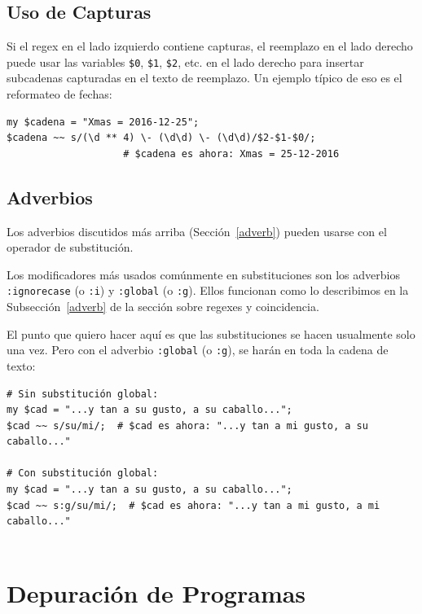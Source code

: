 \subsection{Uso de Capturas}

Si el regex en el lado izquierdo contiene capturas, el 
reemplazo en el lado derecho puede usar las variables
\verb|$0|, \verb|$1|, \verb|$2|, etc. en el lado derecho para 
insertar subcadenas capturadas en el texto de reemplazo. Un 
ejemplo típico de eso es el reformateo de fechas:

\begin{lstlisting}
my $cadena = "Xmas = 2016-12-25";
$cadena ~~ s/(\d ** 4) \- (\d\d) \- (\d\d)/$2-$1-$0/;
                    # $cadena es ahora: Xmas = 25-12-2016
\end{lstlisting}
%

\subsection{Adverbios}
\label{regex_adverbs}

Los adverbios discutidos más arriba (Sección~\ref{adverb})
pueden usarse con el operador de substitución. 

Los modificadores más usados comúnmente en substituciones
son los adverbios {\tt :ignorecase} (o {\tt :i}) y 
{\tt :global} (o {\tt :g}). Ellos funcionan como lo describimos
en la Subsección~\ref{adverb} de la sección sobre regexes 
y coincidencia.

El punto que quiero hacer aquí es que las substituciones se hacen
usualmente solo una vez. Pero con el adverbio 
{\tt :global} (o {\tt :g}), se harán en toda la cadena de texto:

\begin{lstlisting}
# Sin substitución global:
my $cad = "...y tan a su gusto, a su caballo...";
$cad ~~ s/su/mi/;  # $cad es ahora: "...y tan a mi gusto, a su caballo..."

# Con substitución global:
my $cad = "...y tan a su gusto, a su caballo...";
$cad ~~ s:g/su/mi/;  # $cad es ahora: "...y tan a mi gusto, a mi caballo..."
                    
\end{lstlisting}
%


\section{Depuración de Programas}

